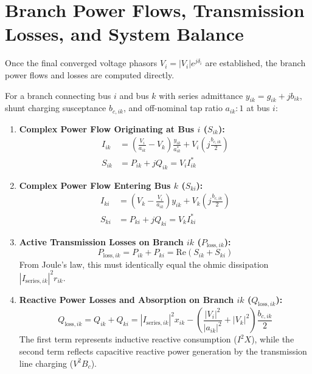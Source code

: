 \documentclass[12pt,a4paper,oneside]{report}
\begin{document}
\section{Branch Power Flows, Transmission Losses, and System Balance}
Once the final converged voltage phasors $V_i = |V_i|e^{j\delta_i}$ are established, the branch power flows and losses are computed directly.

For a branch connecting bus $i$ and bus $k$ with series admittance $y_{ik} = g_{ik} + j b_{ik}$, shunt charging susceptance $b_{c,ik}$, and off-nominal tap ratio $a_{ik}:1$ at bus $i$:
\begin{enumerate}
    \item \textbf{Complex Power Flow Originating at Bus $i$ ($S_{ik}$):}
    \begin{align}
    I_{ik} &= \left( \frac{V_i}{a_{ik}} - V_k \right) \frac{y_{ik}}{a_{ik}^*} + V_i \left( j \frac{b_{c,ik}}{2} \right) \\
    S_{ik} &= P_{ik} + j Q_{ik} = V_i I_{ik}^*
    \end{align}
    \item \textbf{Complex Power Flow Entering Bus $k$ ($S_{ki}$):}
    \begin{align}
    I_{ki} &= \left( V_k - \frac{V_i}{a_{ik}} \right) y_{ik} + V_k \left( j \frac{b_{c,ik}}{2} \right) \\
    S_{ki} &= P_{ki} + j Q_{ki} = V_k I_{ki}^*
    \end{align}
    \item \textbf{Active Transmission Losses on Branch $ik$ ($P_{\text{loss},ik}$):}
    \begin{equation}
    P_{\text{loss},ik} = P_{ik} + P_{ki} = \text{Re}(S_{ik} + S_{ki})
    \end{equation}
    From Joule's law, this must identically equal the ohmic dissipation $|I_{\text{series},ik}|^2 r_{ik}$.
    \item \textbf{Reactive Power Losses and Absorption on Branch $ik$ ($Q_{\text{loss},ik}$):}
    \begin{equation}
    Q_{\text{loss},ik} = Q_{ik} + Q_{ki} = |I_{\text{series},ik}|^2 x_{ik} - \left( \frac{|V_i|^2}{|a_{ik}|^2} + |V_k|^2 \right) \frac{b_{c,ik}}{2}
    \end{equation}
    The first term represents inductive reactive consumption ($I^2 X$), while the second term reflects capacitive reactive power generation by the transmission line charging ($V^2 B_c$).
\end{enumerate}
\end{document}
